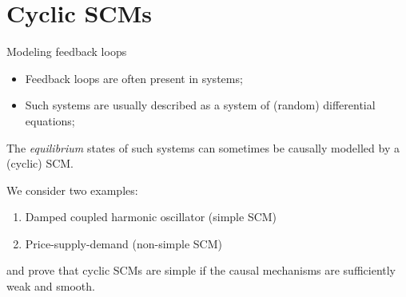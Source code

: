 \part{Cyclic SCMs}
\frame{\partpage}

\begin{frame}{Modeling feedback loops}
  \begin{itemize}
    \item Feedback loops are often present in systems;
    \item Such systems are usually described as a system of (random) differential equations;
  \end{itemize}

  \bigskip
The \emph{equilibrium} states of such systems can sometimes be causally modelled by a (cyclic) SCM.

\bigskip
We consider two examples:
  \begin{enumerate}
    \item Damped coupled harmonic oscillator (simple SCM)
    \item Price-supply-demand (non-simple SCM)
  \end{enumerate}
and prove that cyclic SCMs are simple if the causal mechanisms are sufficiently weak and smooth.
\end{frame}

